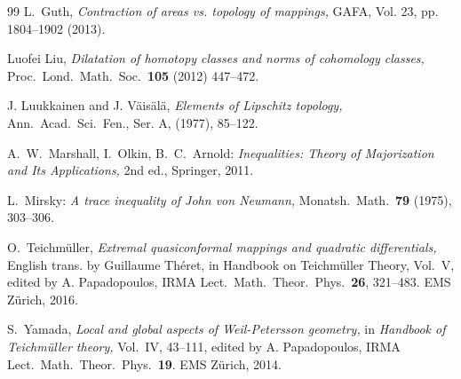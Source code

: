 \documentclass[11pt,letterpaper]{amsart}
\theoremstyle{definition}
\numberwithin{equation}{section}
\theoremstyle{definition}
\begin{document}
\begin{thebibliography}{99}
L.~Guth, 
\textit{Contraction of areas vs. topology of mappings,} GAFA, Vol. 23, pp. 1804--1902 (2013).


Luofei Liu, 
\textit{Dilatation of homotopy classes and norms of cohomology classes, }
Proc.\ Lond.\ Math.\ Soc.\  \textbf{105} (2012) 447--472.

J. Luukkainen and J. V\"ais\"al\"a, 
\textit{Elements of Lipschitz topology,}  Ann.\ Acad.\ Sci.\ Fen., 
Ser. A, (1977), 85--122.

A.~W.~Marshall, I.~Olkin, B.~C.~Arnold:
\textsl{Inequalities: Theory of Majorization and Its Applications,} 2nd ed., Springer, 2011.

L.~Mirsky:
\textit{A trace inequality of John von Neumann,}
Monatsh.\ Math.\ \textbf{79} (1975), 303--306.

O.~Teichm\"uller, \textsl{Extremal quasiconformal mappings and
quadratic differentials,} English trans. by Guillaume Th\'eret, in Handbook on Teichm\"uller Theory, Vol.~V, edited by A. Papadopoulos, IRMA Lect.\ Math.\ Theor.\ Phys.\  \textbf{26}, 321--483. EMS Z\"urich, 2016.

S.~Yamada,
\textit{Local and global aspects of Weil-Petersson geometry,} in \textsl{Handbook of
Teichm\"uller theory,} Vol.~IV, 43--111, edited by A. Papadopoulos, IRMA Lect.\ Math.\ Theor.\ Phys.\ \textbf{19}. EMS Z\"urich, 2014.


\end{thebibliography}
\end{document}
